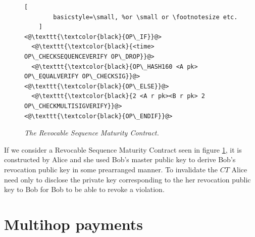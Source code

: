 \newpage
\begin{figure}[hbt!]
	\centering
	\begin{lstlisting}[
		basicstyle=\small, %or \small or \footnotesize etc.
	]
<@\texttt{\textcolor{black}{OP\_IF}}@>
  <@\texttt{\textcolor{black}{<time> OP\_CHECKSEQUENCEVERIFY OP\_DROP}}@>
  <@\texttt{\textcolor{black}{OP\_HASH160 <A pk> OP\_EQUALVERIFY OP\_CHECKSIG}}@>
<@\texttt{\textcolor{black}{OP\_ELSE}}@>
  <@\texttt{\textcolor{black}{2 <A r pk><B r pk> 2 OP\_CHECKMULTISIGVERIFY}}@>
<@\texttt{\textcolor{black}{OP\_ENDIF}}@>
	\end{lstlisting}
	
	\caption{\textit{ The Revocable Sequence Maturity Contract.
	}}
	\label{fig:RSMC}
\end{figure}

If we consider a Revocable Sequence Maturity Contract seen in figure \ref{fig:RSMC}, it is constructed by Alice and she used Bob's master public key to derive Bob's revocation public key in some prearranged manner. To invalidate the $CT$ Alice need only to disclose the private key corresponding to the her revocation public key to Bob for Bob to be able to revoke a violation. 



\section{Multihop payments}

